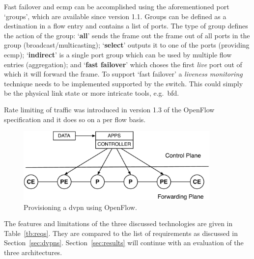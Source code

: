 Fast failover and \ac{ecmp} can be accomplished using the aforementioned port `groups', which are available since version 1.1. Groups can be defined as a destination in a flow entry and contains a list of ports. The type of group defines the action of the group: `\textbf{all}' sends the frame out the frame out of all ports in the group (broadcast/multicasting); `\textbf{select}' outputs it to one of the ports (providing \ac{ecmp}); `\textbf{indirect}' is a single port group which can be used by multiple flow entries (aggregation); and `\textbf{fast failover}' which choses the first \textsl{live} port out of which it will forward the frame. To support `fast failover' a \textsl{liveness monitoring} technique needs to be implemented supported by the switch. This could simply be the physical link state or more intricate tools, e.g.\ \ac{bfd}.

Rate limiting of traffic was introduced in version 1.3 of the OpenFlow specification and it does so on a per flow basis. 


\begin{figure}[!h]
	\centering
	\includegraphics[width=10cm]{./includes/nms-stack-of.pdf}
	\caption{Provisioning a \ac{dvpn} using OpenFlow.}
	\label{fig:nms-stack-of}
\end{figure}


\HRule

The features and limitations of the three discussed technologies are given in Table~\ref{tb:reqs}. They are compared to the list of requirements as discussed in Section~\ref{sec:dvpns}. Section~\ref{sec:results} will continue with an evaluation of the three architectures.

